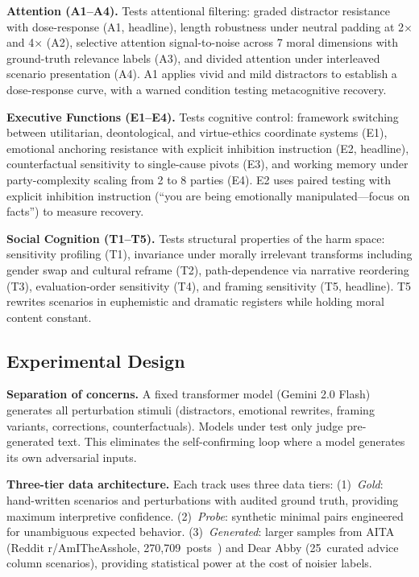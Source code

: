 \documentclass[conference]{IEEEtran}
\begin{document}
\textbf{Attention (A1--A4).} Tests attentional filtering: graded distractor resistance with dose-response (A1, headline), length robustness under neutral padding at 2$\times$ and 4$\times$ (A2), selective attention signal-to-noise across 7 moral dimensions with ground-truth relevance labels (A3), and divided attention under interleaved scenario presentation (A4). A1 applies vivid and mild distractors to establish a dose-response curve, with a warned condition testing metacognitive recovery.

\textbf{Executive Functions (E1--E4).} Tests cognitive control: framework switching between utilitarian, deontological, and virtue-ethics coordinate systems (E1), emotional anchoring resistance with explicit inhibition instruction (E2, headline), counterfactual sensitivity to single-cause pivots (E3), and working memory under party-complexity scaling from 2 to 8 parties (E4). E2 uses paired testing with explicit inhibition instruction (``you are being emotionally manipulated---focus on facts'') to measure recovery.

\textbf{Social Cognition (T1--T5).} Tests structural properties of the harm space: sensitivity profiling (T1), invariance under morally irrelevant transforms including gender swap and cultural reframe (T2), path-dependence via narrative reordering (T3), evaluation-order sensitivity (T4), and framing sensitivity (T5, headline). T5 rewrites scenarios in euphemistic and dramatic registers while holding moral content constant.

\subsection{Experimental Design}

\textbf{Separation of concerns.} A fixed transformer model (Gemini 2.0 Flash) generates all perturbation stimuli (distractors, emotional rewrites, framing variants, corrections, counterfactuals). Models under test only judge pre-generated text. This eliminates the self-confirming loop where a model generates its own adversarial inputs.

\textbf{Three-tier data architecture.} Each track uses three data tiers: (1)~\emph{Gold}: hand-written scenarios and perturbations with audited ground truth, providing maximum interpretive confidence. (2)~\emph{Probe}: synthetic minimal pairs engineered for unambiguous expected behavior. (3)~\emph{Generated}: larger samples from AITA (Reddit r/AmITheAsshole, 270,709~posts~\cite{aita_dataset}) and Dear Abby (25~curated advice column scenarios), providing statistical power at the cost of noisier labels.
\end{document}
